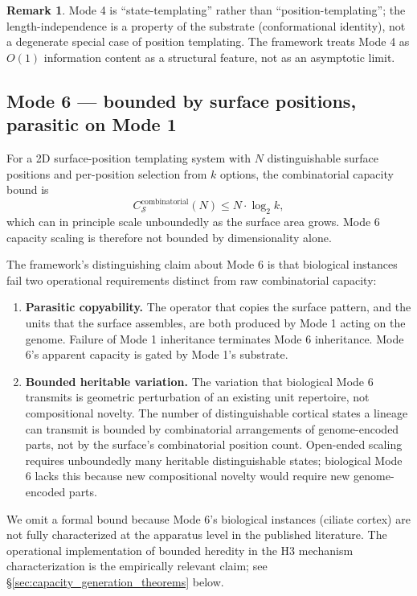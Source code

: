 \documentclass[11pt]{article}
\theoremstyle{plain}
\theoremstyle{definition}
\newtheorem{remark}[theorem]{Remark}
\newcommand{\Csub}{C_{\mathcal{S}}}
\begin{document}
\begin{remark}
Mode 4 is ``state-templating'' rather than ``position-templating''; the length-independence is a property of the substrate (conformational identity), not a degenerate special case of position templating. The framework treats Mode 4 as $O(1)$ information content as a structural feature, not as an asymptotic limit.
\end{remark}

\subsection{Mode 6 --- bounded by surface positions, parasitic on Mode 1}
\label{sec:mode6}

For a 2D surface-position templating system with $N$ distinguishable surface positions and per-position selection from $k$ options, the combinatorial capacity bound is
\[
\Csub^{\mathrm{combinatorial}}(N) \le N \cdot \log_2 k,
\]
which can in principle scale unboundedly as the surface area grows. Mode 6 capacity scaling is therefore not bounded by dimensionality alone.

The framework's distinguishing claim about Mode 6 is that biological instances fail two operational requirements distinct from raw combinatorial capacity:

\begin{enumerate}
  \item \textbf{Parasitic copyability.} The operator that copies the surface pattern, and the units that the surface assembles, are both produced by Mode 1 acting on the genome. Failure of Mode 1 inheritance terminates Mode 6 inheritance. Mode 6's apparent capacity is gated by Mode 1's substrate.
  \item \textbf{Bounded heritable variation.} The variation that biological Mode 6 transmits is geometric perturbation of an existing unit repertoire, not compositional novelty. The number of distinguishable cortical states a lineage can transmit is bounded by combinatorial arrangements of genome-encoded parts, not by the surface's combinatorial position count. Open-ended scaling requires unboundedly many heritable distinguishable states; biological Mode 6 lacks this because new compositional novelty would require new genome-encoded parts.
\end{enumerate}

We omit a formal bound because Mode 6's biological instances (ciliate cortex) are not fully characterized at the apparatus level in the published literature. The operational implementation of bounded heredity in the H3 mechanism characterization is the empirically relevant claim; see \S\ref{sec:capacity_generation_theorems} below.
\end{document}
